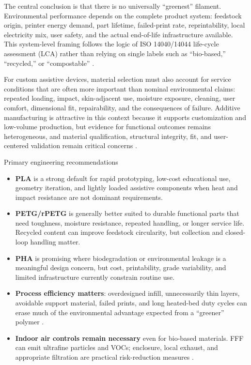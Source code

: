 \documentclass[11pt]{article}
\begin{document}
The central conclusion is that there is no universally ``greenest'' filament. Environmental performance depends on the complete product system: feedstock origin, printer energy demand, part lifetime, failed-print rate, reprintability, local electricity mix, user safety, and the actual end-of-life infrastructure available. This system-level framing follows the logic of ISO 14040/14044 life-cycle assessment (LCA) rather than relying on single labels such as ``bio-based,'' ``recycled,'' or ``compostable'' \cite{iso14040,iso14044}.

For custom assistive devices, material selection must also account for service conditions that are often more important than nominal environmental claims: repeated loading, impact, skin-adjacent use, moisture exposure, cleaning, user comfort, dimensional fit, repairability, and the consequences of failure. Additive manufacturing is attractive in this context because it supports customization and low-volume production, but evidence for functional outcomes remains heterogeneous, and material qualification, structural integrity, fit, and user-centered validation remain critical concerns \cite{chen2016,tenkate2017,sakib2023,rasmussen2026,coelho2026}.

\begin{keybox}{Primary engineering recommendations}
\begin{itemize}
  \item \textbf{PLA} is a strong default for rapid prototyping, low-cost educational use, geometry iteration, and lightly loaded assistive components when heat and impact resistance are not dominant requirements.
  \item \textbf{PETG/rPETG} is generally better suited to durable functional parts that need toughness, moisture resistance, repeated handling, or longer service life. Recycled content can improve feedstock circularity, but collection and closed-loop handling matter.
  \item \textbf{PHA} is promising where biodegradation or environmental leakage is a meaningful design concern, but cost, printability, grade variability, and limited infrastructure currently constrain routine use.
  \item \textbf{Process efficiency matters}: overdesigned infill, unnecessarily thin layers, avoidable support material, failed prints, and long heated-bed duty cycles can erase much of the environmental advantage expected from a ``greener'' polymer \cite{sola2024,kreiger2013}.
  \item \textbf{Indoor air controls remain necessary} even for bio-based materials. FFF can emit ultrafine particles and VOCs; enclosure, local exhaust, and appropriate filtration are practical risk-reduction measures \cite{stephens2013,azimi2016,niosh2023}.
\end{itemize}
\end{keybox}
\end{document}
